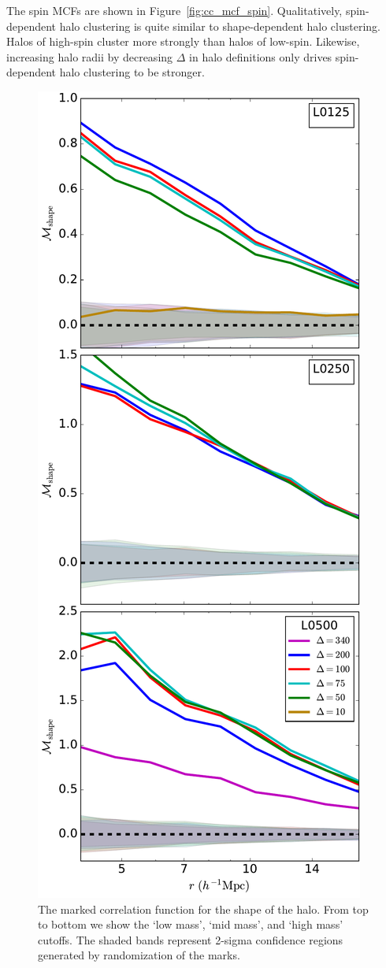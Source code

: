 \documentclass[usenatbib,usegraphicx,letterpaper]{mn2e}
\begin{document}
The spin MCFs are shown in Figure~\ref{fig:cc_mcf_spin}. Qualitatively, spin-dependent halo clustering is 
quite similar to shape-dependent halo clustering. Halos of high-spin cluster more strongly than halos of 
low-spin.  Likewise, increasing halo radii by decreasing $\Delta$
in halo definitions only drives spin-dependent halo clustering to be stronger.

\begin{figure}
	\centering
	\includegraphics[width=.4\textwidth]{all_mcf_shape.pdf}
	\caption{
	The marked correlation function for the shape of the halo. From top to bottom we show the `low mass', `mid mass', and `high mass' cutoffs. The shaded bands represent 2-sigma confidence regions generated by randomization of the marks. 
}
	\label{fig:cc_mcf_s}
\end{figure}
\end{document}
